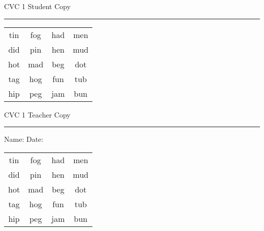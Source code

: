 \documentclass{memoir}
\begin{document}

\footnotesize \noindent
CVC 1 \hfill Student Copy
\smallskip
\hrule

\huge

\setlength{\tabcolsep}{14pt}
\def\arraystretch{2}

{\selectfont


\begin{vplace}[0.5]
\begin{center}
\begin{tabular}{cccc}
tin & fog & had & men \\
did & pin & hen & mud \\
hot & mad & beg & dot \\
tag & hog & fun & tub \\
hip & peg & jam & bun \\
\end{tabular}
\end{center}
\end{vplace}

}

\newpage

\footnotesize \noindent
CVC 1 \hfill Teacher Copy
\smallskip
\hrule

\normalsize

\vfill

\noindent
Name: \underline{\hspace{1.75in}} \hfill Date: \underline{\hspace{1in}}

\huge

{\selectfont


\begin{vplace}[0.5]
\begin{center}
\begin{tabular}{cccc}
tin & fog & had & men \\
did & pin & hen & mud \\
hot & mad & beg & dot \\
tag & hog & fun & tub \\
hip & peg & jam & bun \\
\end{tabular}
\end{center}
\end{vplace}



}
\end{document}
